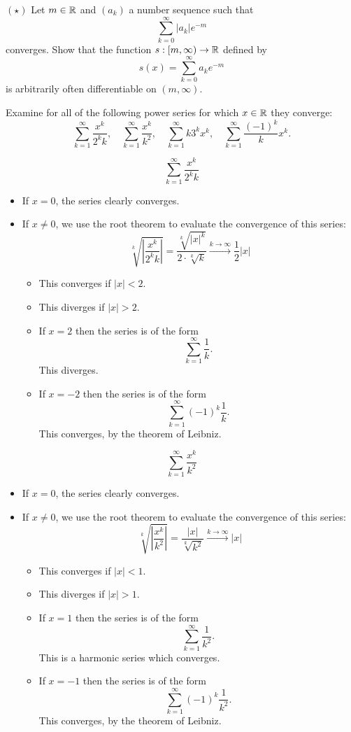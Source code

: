 \documentclass[week=12]{homework}
\begin{document}
\begin{questions}
		\question
		$(\star)$ Let $m \in \mathbb{R}$ and $(a_k)$ a number sequence such that 
		\[
			\sum_{k=0}^{\infty} |a_k|e^{-m}
		\]
		converges. Show that the function $s : [m,\infty) \to \mathbb{R}$ defined by 
		\[
			s(x) = \sum_{k=0}^{\infty} a_k e^{-m}
		\] 
		is arbitrarily often differentiable on $(m,\infty)$. 

	     \question
	     Examine for all of the following power series for which $x \in \mathbb{R}$ they converge:
	     \[
	     \sum_{k=1}^{\infty} \frac{x^k}{2^k k}, \quad 
	     \sum_{k=1}^{\infty} \frac{x^k}{k^2}, \quad
	     \sum_{k=1}^{\infty} k 3^k x^k, \quad 
	     \sum_{k=1}^{\infty} \frac{(-1)^k}{k} x^k.
	     \]
	     
	     \[
			 \sum_{k=1}^{\infty} \frac{x^k}{2^k k}    
	     \]
	     \begin{itemize}
	     	\item If $x = 0$, the series clearly converges. 
	     	\item If $x \not = 0$, we use the root theorem to evaluate the convergence of this series:
	     	\[
		     	\sqrt[k]{\left| \frac{x^k}{2^k k} \right|} = \frac{\sqrt[k]{|x|^k}}{2 \cdot \sqrt[k]{k}} \xrightarrow{k \to \infty} \frac{1}{2} |x|
	     	\]
	     	\begin{itemize}
	     		\item This converges if $|x| < 2$.
	     		\item This diverges if $|x| > 2$.
	     		\item If $x = 2$ then the series is of the form 
	     		\[
		     		\sum_{k=1}^{\infty} \frac{1}{k}.
	     		\]
	     		This diverges. 
	     		\item If $x = -2$ then the series is of the form 
	     		\[
		     		\sum_{k=1}^{\infty} (-1)^k \frac{1}{k}.
	     		\]
	     		This converges, by the theorem of Leibniz. 
	     	\end{itemize}
	     \end{itemize}
	     
	     \[
	     \sum_{k=1}^{\infty} \frac{x^k}{k^2}   
	     \]
	     \begin{itemize}
	     	\item If $x = 0$, the series clearly converges. 
	     	\item If $x \not = 0$, we use the root theorem to evaluate the convergence of this series:
	     	\[
		     	\sqrt[k]{\left| \frac{x^k}{k^2} \right|} = \frac{|x|}{\sqrt[k]{k^2}} \xrightarrow{k \to \infty} |x|
	     	\]
	     	\begin{itemize}
	     		\item This converges if $|x| < 1$.
	     		\item This diverges if $|x| > 1$.
	     		\item If $x = 1$ then the series is of the form 
	     		\[
	     		\sum_{k=1}^{\infty} \frac{1}{k^2}.
	     		\]
	     		This is a harmonic series which converges. 
	     		\item If $x = -1$ then the series is of the form 
	     		\[
	     		\sum_{k=1}^{\infty} (-1)^k \frac{1}{k^2}.
	     		\]
	     		This converges, by the theorem of Leibniz. 
	     	\end{itemize}
	     \end{itemize}
	     

\end{questions}
\end{document}
